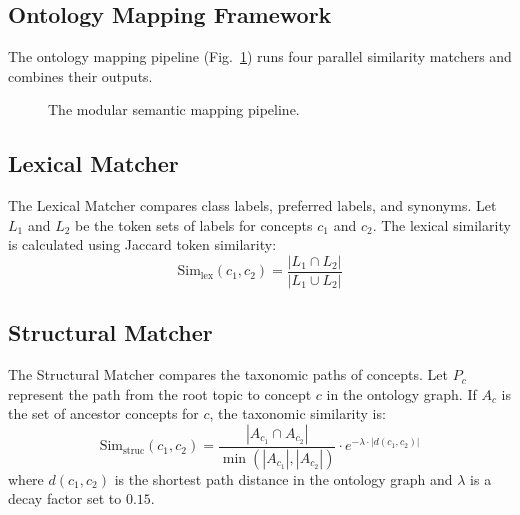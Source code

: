 \documentclass[journal,compsoc]{IEEEtran}
\begin{document}
\begin{itemize}
\begin{table}[t]
\begin{itemize}
\section{Ontology Mapping Framework}
The ontology mapping pipeline (Fig.~\ref{fig:mapping}) runs four parallel similarity matchers and combines their outputs.

\begin{figure}[h]
\centering
{}
\caption{The modular semantic mapping pipeline.}
\label{fig:mapping}
\end{figure}

\subsection{Lexical Matcher}
The Lexical Matcher compares class labels, preferred labels, and synonyms. Let $L_1$ and $L_2$ be the token sets of labels for concepts $c_1$ and $c_2$. The lexical similarity is calculated using Jaccard token similarity:
\begin{equation}
\text{Sim}_{\text{lex}}(c_1, c_2) = \frac{|L_1 \cap L_2|}{|L_1 \cup L_2|}
\end{equation}

\subsection{Structural Matcher}
The Structural Matcher compares the taxonomic paths of concepts. Let $P_{c}$ represent the path from the root topic to concept $c$ in the ontology graph. If $A_c$ is the set of ancestor concepts for $c$, the taxonomic similarity is:
\begin{equation}
\text{Sim}_{\text{struc}}(c_1, c_2) = \frac{|A_{c_1} \cap A_{c_2}|}{\min(|A_{c_1}|, |A_{c_2}|)} \cdot e^{-\lambda \cdot |d(c_1, c_2)|}
\end{equation}
where $d(c_1, c_2)$ is the shortest path distance in the ontology graph and $\lambda$ is a decay factor set to $0.15$.


\end{itemize}
\end{table}
\end{itemize}
\end{document}
